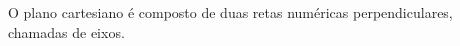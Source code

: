 \documentclass[preview]{standalone}
\begin{document}
\begin{center}
O plano cartesiano é composto de duas retas numéricas perpendiculares, chamadas de eixos.
\end{center}
\end{document}
